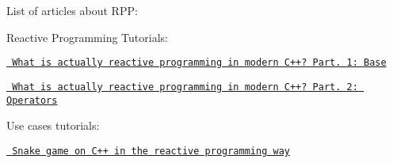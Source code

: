 List of articles about R\+PP\+:

Reactive Programming Tutorials\+:
\begin{DoxyItemize}
\item \href{https://medium.com/@victimsnino/what-is-actually-reactive-programming-in-modern-c-part-1-base-929355ac2901?source=friends_link&sk=59986e68b0688469c65ca0c757bbfd89}{\texttt{ What is actually reactive programming in modern C++? Part. 1\+: Base}}
\item \href{https://itnext.io/what-is-actually-reactive-programming-in-modern-c-part-2-operators-63d5ea7223cc?source=friends_link&sk=73cc7b8928d2944569e07f402d43d123}{\texttt{ What is actually reactive programming in modern C++? Part. 2\+: Operators}}
\end{DoxyItemize}

Use cases tutorials\+:
\begin{DoxyItemize}
\item \href{https://medium.com/@victimsnino/snake-game-on-c-in-the-reactive-programming-way-19310a73923a?source=friends_link&sk=608039f66da373d4f81c806ffe58298c}{\texttt{ Snake game on C++ in the reactive programming way}} 
\end{DoxyItemize}